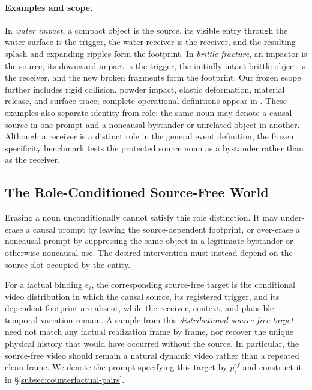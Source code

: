 \paragraph{Examples and scope.}
In \emph{water impact}, a compact object is the source, its visible entry
through the water surface is the trigger, the water receiver is the
receiver, and the resulting splash and expanding ripples form the footprint.
In \emph{brittle fracture}, an impactor is the source, its downward impact is
the trigger, the initially intact brittle object is the receiver, and the new
broken fragments form the footprint. Our frozen scope further includes rigid
collision, powder impact, elastic deformation, material release, and surface
trace; complete operational definitions appear in
. These examples also separate identity from role:
the same noun may denote a causal source in one prompt and a noncausal
bystander or unrelated object in another. Although a receiver is a distinct
role in the general event definition, the frozen specificity benchmark tests
the protected source noun as a bystander rather than as the receiver.

\subsection{The Role-Conditioned Source-Free World}
\label{subsec:no-source-world}

Erasing a noun unconditionally cannot satisfy this role distinction. It may
under-erase a causal prompt by leaving the source-dependent footprint, or
over-erase a noncausal prompt by suppressing the same object in a legitimate
bystander or otherwise noncausal use. The desired intervention must instead
depend on the source slot occupied by the entity.

For a factual binding $e_i$, the corresponding source-free target is the
conditional video distribution in which the causal source, its registered
trigger, and its dependent footprint are absent, while the receiver, context,
and plausible temporal variation remain. A sample from this
\emph{distributional source-free target} need not match any factual
realization frame by frame, nor recover the unique physical history that would
have occurred without the source. In particular, the source-free video should
remain a natural dynamic video rather than a repeated clean frame. We denote
the prompt specifying this target by $p_i^{cf}$ and construct it in
\S\ref{subsec:counterfactual-pairs}.

